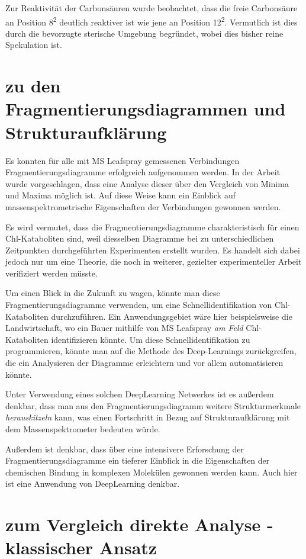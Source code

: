 Zur Reaktivität der Carbonsäuren wurde beobachtet, dass die freie Carbonsäure an Position 8\textsuperscript{2} deutlich reaktiver ist wie jene an Position 12\textsuperscript{2}. Vermutlich ist dies durch die bevorzugte sterische Umgebung begründet, wobei dies bisher reine Spekulation ist.

\section{zu den Fragmentierungsdiagrammen und Strukturaufklärung}

Es konnten für alle mit MS Leafspray gemessenen Verbindungen Fragmentierungsdiagramme erfolgreich aufgenommen werden. In der Arbeit wurde vorgeschlagen, dass eine Analyse dieser über den Vergleich von Minima und Maxima möglich ist. Auf diese Weise kann ein Einblick auf massenspektrometrische Eigenschaften der Verbindungen gewonnen werden. 

Es wird vermutet, dass die Fragmentierungsdiagramme charakteristisch für einen Chl-Kataboliten sind, weil diesselben Diagramme bei zu unterschiedlichen Zeitpunkten durchgeführten Experimenten erstellt wurden. Es handelt sich dabei jedoch nur um eine Theorie, die noch in weiterer, gezielter experimenteller Arbeit verifiziert werden müsste.

Um einen Blick in die Zukunft zu wagen, könnte man diese Fragmentierungsdiagramme verwenden, um eine Schnellidentifikation von Chl-Kataboliten durchzuführen. Ein Anwendungsgebiet wäre hier beispielsweise die Landwirtschaft, wo ein Bauer mithilfe von MS Leafspray \textit{am Feld} Chl-Kataboliten identifizieren könnte. Um diese Schnellidentifikation zu programmieren, könnte man auf die Methode des Deep-Learnings zurückgreifen, die ein Analysieren der Diagramme erleichtern und vor allem automatisieren könnte. 

Unter Verwendung eines solchen DeepLearning Netwerkes ist es außerdem denkbar, dass man aus den Fragmentierungsdiagramm weitere Strukturmerkmale \textit{herauskitzeln} kann, was einen Fortschritt in Bezug auf Strukturaufklärung mit dem Massenspektrometer bedeuten würde.

Außerdem ist denkbar, dass über eine intensivere Erforschung der Fragmentierungsdiagramme ein tieferer Einblick in die Eigenschaften der chemischen Bindung in komplexen Molekülen gewonnen werden kann. Auch hier ist eine Anwendung von DeepLearning denkbar.

\section{zum Vergleich direkte Analyse - klassischer Ansatz}

